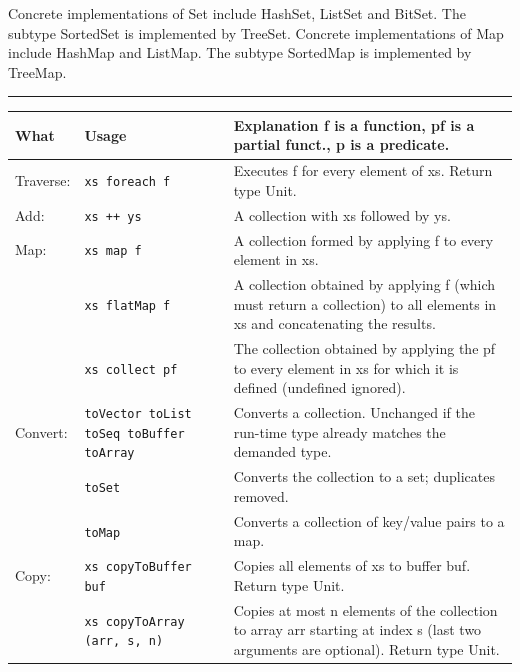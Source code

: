 \documentclass[article, a5paper]{memoir}
\newcommand{\LangColor}{red}
\newcommand{\head}[1]{{\bfseries {\color{\LangColor}{#1}}\par\vspace{1mm}\hrule\vspace{-2mm}}}
\renewcommand{\arraystretch}{0.9}
\newcommand{\Newline}{\vspace{\baselineskip}}
\begin{document}
{\small Concrete implementations of Set include HashSet, ListSet and BitSet. The subtype SortedSet is implemented by TreeSet.
Concrete implementations of Map include HashMap and ListMap. The subtype SortedMap is implemented by TreeMap.
}

\clearpage

\head{Methods in trait \texttt{Traversable[A]}}\Newline

{\small\renewcommand{\arraystretch}{1.2}
\begin{tabular}{@{}l p{3.5cm} p{6.8cm}}
\textbf{What} & \textbf{Usage} & \textbf{Explanation} f is a function, pf is a partial funct., p is a predicate.\\ \hline
Traverse: & \texttt{xs foreach f} & Executes f for every element of xs. Return type Unit.\\ \cline{1-3}

  Add: & \texttt{xs ++ ys} & A collection with xs followed by ys.\\\cline{1-3}
  
  Map: & \texttt{xs map f} & A collection formed by applying f to every element in xs.\\ \cline{2-3}
       & \texttt{xs flatMap f} & A collection obtained by applying f (which must return a collection) to all elements in xs and concatenating the results.\\ \cline{2-3}
       & \texttt{xs collect pf} & The collection obtained by applying the pf to every element in xs for which it is defined (undefined ignored).\\ \cline{1-3}

  Convert: & \texttt{toVector toList toSeq toBuffer toArray} & Converts a collection. Unchanged if the run-time type already matches the demanded type.\\ \cline{2-3}
   & \texttt{toSet} & Converts the collection to a set; duplicates removed.\\ \cline{2-3}
   & \texttt{toMap} & Converts a collection of key/value pairs to a map. \\ \cline{1-3}

  Copy: & \texttt{xs copyToBuffer buf } & Copies all elements of xs to buffer buf. Return type Unit.\\ \cline{2-3}
   & \texttt{xs copyToArray (arr, s, n)} & Copies at most n elements of the collection to array arr starting at index s (last two arguments are optional). Return type Unit.\\ \cline{1-3}


\end{tabular}}
\end{document}
